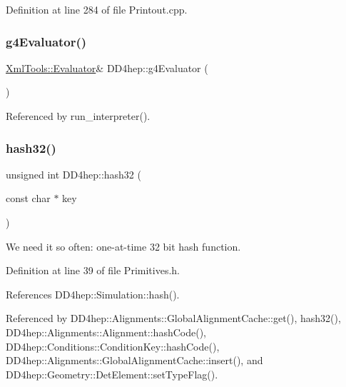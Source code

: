 Definition at line 284 of file Printout.\+cpp.

\hypertarget{namespace_d_d4hep_a2c55ed8f8639b7c032f6ea646bf7898d}{}\label{namespace_d_d4hep_a2c55ed8f8639b7c032f6ea646bf7898d} 
\subsubsection{\texorpdfstring{g4\+Evaluator()}{g4Evaluator()}}
{\footnotesize\ttfamily \hyperlink{class_xml_tools_1_1_evaluator}{Xml\+Tools\+::\+Evaluator}\& D\+D4hep\+::g4\+Evaluator (\begin{DoxyParamCaption}{ }\end{DoxyParamCaption})}



Referenced by run\+\_\+interpreter().

\hypertarget{namespace_d_d4hep_a64c38e1f6b17efb9177457a3f2690daa}{}\label{namespace_d_d4hep_a64c38e1f6b17efb9177457a3f2690daa} 
\subsubsection{\texorpdfstring{hash32()}{hash32()}\hspace{0.1cm}{\footnotesize\ttfamily [1/2]}}
{\footnotesize\ttfamily unsigned int D\+D4hep\+::hash32 (\begin{DoxyParamCaption}\item[{const char $\ast$}]{key }\end{DoxyParamCaption})\hspace{0.3cm}{\ttfamily [inline]}}



We need it so often\+: one-\/at-\/time 32 bit hash function. 



Definition at line 39 of file Primitives.\+h.



References D\+D4hep\+::\+Simulation\+::hash().



Referenced by D\+D4hep\+::\+Alignments\+::\+Global\+Alignment\+Cache\+::get(), hash32(), D\+D4hep\+::\+Alignments\+::\+Alignment\+::hash\+Code(), D\+D4hep\+::\+Conditions\+::\+Condition\+Key\+::hash\+Code(), D\+D4hep\+::\+Alignments\+::\+Global\+Alignment\+Cache\+::insert(), and D\+D4hep\+::\+Geometry\+::\+Det\+Element\+::set\+Type\+Flag().

